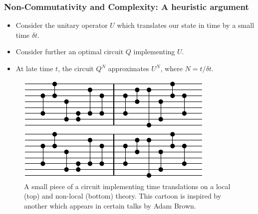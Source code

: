 \documentclass[8pt,aspectratio=169]{beamer}
\begin{document}
\begin{frame}
\frametitle{Non-Commutativity and Complexity: A heuristic argument}

\begin{minipage}[t]{0.5\linewidth}

\begin{itemize}

\item Consider the unitary operator $U$ which translates our state in time by a small time $\delta t$. 

\item Consider further an optimal circuit $Q$ implementing $U$.

\item At late time $t$, the circuit $Q^N$ approximates $U^N$, where $N= t/\delta t$.

\end{itemize}

\end{minipage}\hfill
%
\begin{minipage}[t]{0.48\linewidth}

\begin{figure}
    \begin{center}
    
        \includegraphics[scale=1]{animation/animation_1}    
        
        \vspace{2mm}
        
        \includegraphics[scale=1]{animation/animation_1}    
    
    \end{center}
    \caption{A small piece of a circuit implementing time translations on a local (top) and non-local (bottom) theory. This cartoon is inspired by another which appears in certain talks by Adam Brown.}
\end{figure}

\end{minipage}

\end{frame}
\end{document}

